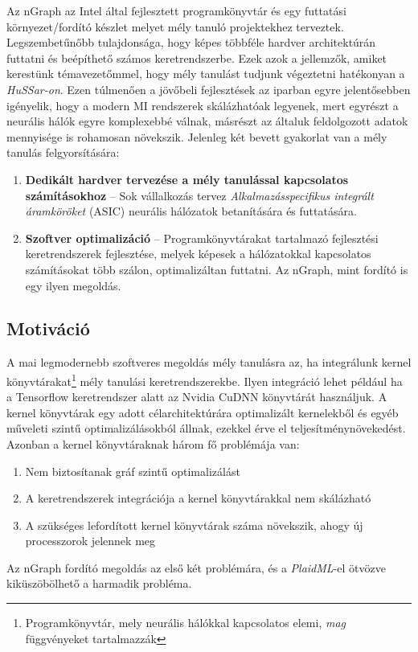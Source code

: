 Az nGraph az Intel által fejlesztett programkönyvtár és egy futtatási környezet/fordító készlet melyet mély tanuló projektekhez terveztek.
Legszembetűnőbb tulajdonsága, hogy képes többféle hardver architektúrán futtatni és beépíthető számos keretrendszerbe.
Ezek azok a jellemzők, amiket kerestünk témavezetőmmel, hogy mély tanulást tudjunk végeztetni hatékonyan a \emph{HuSSar-on}. 
Ezen túlmenően a jövőbeli fejlesztések az iparban egyre jelentősebben igényelik, hogy a modern MI rendszerek skálázhatóak legyenek, mert egyrészt a neurális hálók egyre komplexebbé válnak, másrészt az általuk feldolgozott adatok mennyisége is rohamosan növekszik. Jelenleg két bevett gyakorlat van a mély tanulás felgyorsítására:
\begin{enumerate}[noitemsep]
	\item \textbf{Dedikált hardver tervezése a mély tanulással kapcsolatos számításokhoz} -- Sok vállalkozás tervez \emph{Alkalmazásspecifikus integrált áramköröket} (ASIC) neurális hálózatok betanítására és futtatására.
	\item \textbf{Szoftver optimalizáció} -- Programkönyvtárakat tartalmazó fejlesztési keretrendszerek fejlesztése, melyek képesek a hálózatokkal kapcsolatos számításokat több szálon, optimalizáltan futtatni. Az nGraph, mint fordító is egy ilyen megoldás.
\end{enumerate}

\subsection{Motiváció}
A mai legmodernebb szoftveres megoldás mély tanulásra az, ha integrálunk kernel könyvtárakat\footnote{Programkönyvtár, mely neurális hálókkal kapcsolatos elemi, \emph{mag} függvényeket tartalmazzák} mély tanulási keretrendszerekbe.
Ilyen integráció lehet például ha a Tensorflow keretrendszer alatt az Nvidia CuDNN könyvtárát használjuk.
A {kernel könyvtárak} egy adott célarchitektúrára optimalizált kernelekből és egyéb műveleti szintű optimalizálásokból állnak, ezekkel érve el teljesítménynövekedést.
Azonban a kernel könyvtáraknak három fő problémája van:
\begin{enumerate}
	\item Nem biztosítanak gráf szintű optimalizálást
	\item A keretrendszerek integrációja a {kernel könyvtárakkal} nem skálázható
	\item A szükséges lefordított kernel könyvtárak száma növekszik, ahogy új processzorok jelennek meg
\end{enumerate}
Az nGraph fordító megoldás az első két problémára, és a \emph{PlaidML}-el ötvözve kiküszöbölhető a harmadik probléma.
